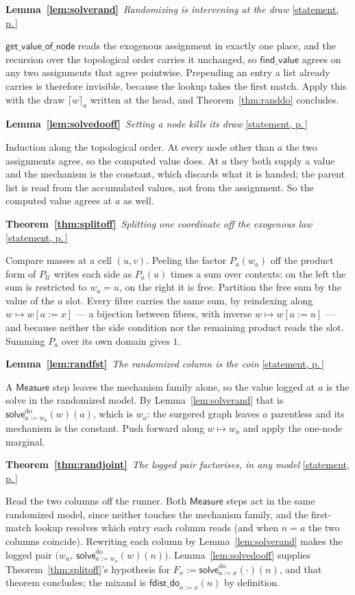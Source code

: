 \documentclass[11pt,a4paper]{article}
\theoremstyle{definition}
\theoremstyle{plain}
\theoremstyle{remark}
\newcommand{\Ctx}{\mathcal{U}}         %
\newcommand{\solve}{\mathsf{solve}}
\newcommand{\solvedo}{\solve^{\mathrm{do}}}
\newcommand{\fdo}{\mathsf{fdist\_do}}
\newcommand{\fv}{\mathsf{find\_value}}
\newenvironment{proofof}[3]{%
  \par\medskip\phantomsection\label{pf:#1}%
  \noindent\textbf{#2~\ref{#1}}\ \emph{#3}\quad
  \hyperref[#1]{\small[statement, p.\,\pageref{#1}]}\par\nobreak
  \noindent\ignorespaces}{\par}
\begin{document}
\begin{proofof}{lem:solverand}{Lemma}{Randomizing is intervening at the draw}
$\mathsf{get\_value\_of\_node}$ reads the exogenous assignment in exactly
one place, and the recursion over the topological order carries it
unchanged, so $\fv$ agrees on any two assignments that agree pointwise.
Prepending an entry a list already carries is therefore invisible, because
the lookup takes the first match. Apply this with the draw
$\lceil w \rceil_a$ written at the head, and Theorem~\ref{thm:randdo}
concludes.
\end{proofof}

\begin{proofof}{lem:solvedooff}{Lemma}{Setting a node kills its draw}
Induction along the topological order. At every node other than $a$ the
two assignments agree, so the computed value does. At $a$ they both
supply a value and the mechanism is the constant, which discards what it
is handed; the parent list is read from the accumulated values, not from
the assignment. So the computed value agrees at $a$ as well.
\end{proofof}

\begin{proofof}{thm:splitoff}{Theorem}{Splitting one coordinate off the exogenous law}
Compare masses at a cell $(u,v)$. Peeling the factor $P_a(w_a)$ off the
product form of $P_\Ctx$ writes each side as $P_a(u)$ times a sum over
contexts: on the left the sum is restricted to $w_a = u$, on the right it
is free. Partition the free sum by the value of the $a$ slot. Every fibre
carries the same sum, by reindexing along $w \mapsto w[a := x]$ --- a
bijection between fibres, with inverse $w \mapsto w[a := u]$ --- and
because neither the side condition nor the remaining product reads the
slot. Summing $P_a$ over its own domain gives $1$.
\end{proofof}

\begin{proofof}{lem:randfst}{Lemma}{The randomized column is the coin}
A $\mathsf{Measure}$ step leaves the mechanism family alone, so the value
logged at $a$ is the solve in the randomized model. By
Lemma~\ref{lem:solverand} that is $\solvedo_{a := w_a}(w)(a)$, which is
$w_a$: the surgered graph leaves $a$ parentless and its mechanism is the
constant. Push forward along $w \mapsto w_a$ and apply the one-node
marginal.
\end{proofof}

\begin{proofof}{thm:randjoint}{Theorem}{The logged pair factorises, in any model}
Read the two columns off the runner. Both $\mathsf{Measure}$ steps act in
the same randomized model, since neither touches the mechanism family, and
the first-match lookup resolves which entry each column reads (and when
$n = a$ the two columns coincide). Rewriting each column by
Lemma~\ref{lem:solverand} makes the logged pair
$\bigl(w_a,\ \solvedo_{a := w_a}(w)(n)\bigr)$.
Lemma~\ref{lem:solvedooff} supplies Theorem~\ref{thm:splitoff}'s
hypothesis for $F_x := \solvedo_{a := x}(\cdot)(n)$, and that theorem
concludes; the mixand is $\fdo_{a := x}(n)$ by definition.
\end{proofof}
\end{document}
